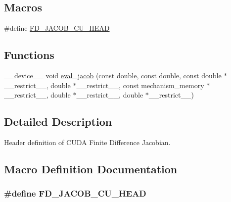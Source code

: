 \subsection*{Macros}
\begin{DoxyCompactItemize}
\item 
\#define \hyperlink{fd__jacob_8cuh_a8c04292c7243648197f5d86f968751d4}{F\+D\+\_\+\+J\+A\+C\+O\+B\+\_\+\+C\+U\+\_\+\+H\+E\+AD}
\end{DoxyCompactItemize}
\subsection*{Functions}
\begin{DoxyCompactItemize}
\item 
\+\_\+\+\_\+device\+\_\+\+\_\+ void \hyperlink{fd__jacob_8cuh_ae6506bc13e5e14169a45e3a48846da16}{eval\+\_\+jacob} (const double, const double, const double $\ast$\+\_\+\+\_\+restrict\+\_\+\+\_\+, double $\ast$\+\_\+\+\_\+restrict\+\_\+\+\_\+, const mechanism\+\_\+memory $\ast$\+\_\+\+\_\+restrict\+\_\+\+\_\+, double $\ast$\+\_\+\+\_\+restrict\+\_\+\+\_\+, double $\ast$\+\_\+\+\_\+restrict\+\_\+\+\_\+)
\end{DoxyCompactItemize}


\subsection{Detailed Description}
Header definition of C\+U\+DA Finite Difference Jacobian. 



\subsection{Macro Definition Documentation}
\subsubsection[{\texorpdfstring{F\+D\+\_\+\+J\+A\+C\+O\+B\+\_\+\+C\+U\+\_\+\+H\+E\+AD}{FD_JACOB_CU_HEAD}}]{\setlength{\rightskip}{0pt plus 5cm}\#define F\+D\+\_\+\+J\+A\+C\+O\+B\+\_\+\+C\+U\+\_\+\+H\+E\+AD}\hypertarget{fd__jacob_8cuh_a8c04292c7243648197f5d86f968751d4}{}\label{fd__jacob_8cuh_a8c04292c7243648197f5d86f968751d4}


